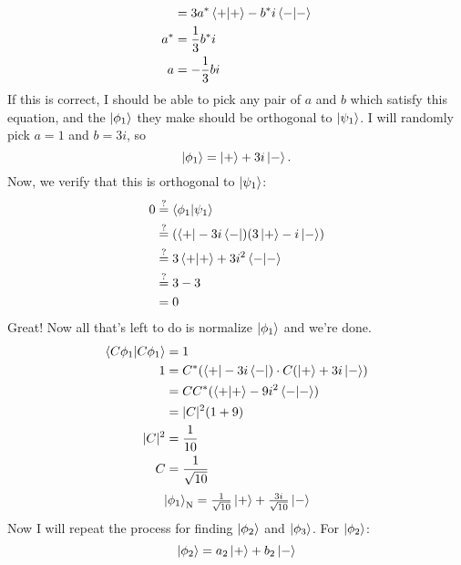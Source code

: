\documentclass[11pt]{article}
\newcommand\abs[1]{\lvert#1\rvert}
\begin{document}
\begin{enumerate}[label=\textbf{\arabic*.}, start=2]
{\begin{enumerate}[label=\textbf{(\alph*)}]
{\begin{align*}
                        &=3a^*\braket{+|+}-b^*i\braket{-|-} \\
                        a^*&=\frac 1 3 b^*i \\
                        a&=-\frac 1 3 bi
                    \end{align*}
                    If this is correct, I should be able to pick any pair of \(a\) and \(b\) which satisfy this equation, and the \(\ket{\phi_1}\) they make should be orthogonal to \(\ket{\psi_1}\). I will randomly pick \(a=1\) and \(b=3i\), so
                    \[\ket{\phi_1}=\ket{+}+3i\ket{-}.\]
                    Now, we verify that this is orthogonal to \(\ket{\psi_1}\):
                    \begin{align*}
                        0&\stackrel{?}{=}\braket{\phi_1|\psi_1} \\
                        &\stackrel{?}{=}(\bra{+}-3i\bra{-})(3\ket{+}-i\ket{-}) \\
                        &\stackrel{?}{=}3\braket{+|+}+3i^2\braket{-|-} \\
                        &\stackrel{?}{=}3-3 \\
                        &=0
                    \end{align*}
                    Great! Now all that's left to do is normalize \(\ket{\phi_1}\) and we're done.
                    \begin{align*}
                        \braket{C\phi_1|C\phi_1}&=1 \\
                        1&=C^*(\bra{+}-3i\bra{-})\cdot C(\ket{+}+3i\ket{-}) \\
                        &=CC^*(\braket{+|+}-9i^2\braket{-|-}) \\
                        &=\abs{C}^2(1+9) \\
                        \abs{C}^2&=\frac{1}{10} \\
                        C&=\frac{1}{\sqrt{10}}
                    \end{align*}
                    \begin{equation*}
                        \ket{\phi_1}_\mathrm{N}=\tfrac{1}{\sqrt{10}}\ket{+}+\tfrac{3i}{\sqrt{10}}\ket{-}
                    \end{equation*}
                    Now I will repeat the process for finding \(\ket{\phi_2}\) and \(\ket{\phi_3}\). For \(\ket{\phi_2}\):
                    \begin{equation*}
                        \ket{\phi_2}=a_2\ket{+}+b_2\ket{-}
                    \end{equation*}
}
\end{enumerate}}
\end{enumerate}
\end{document}
